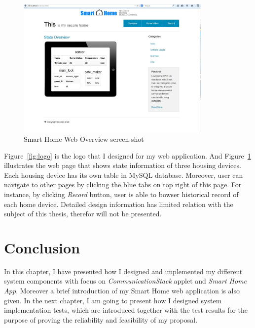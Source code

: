 \begin{figure}[!htb]
	\centering
	\includegraphics[width=0.85\textwidth]{Images/design/overview.jpg}
		\caption{Smart Home Web Overview screen-shot}
	\label{fig:smart-home-frontpage}
\end{figure}

Figure~\ref{fig:logo} is the logo that I designed for my web application. And Figure~\ref{fig:smart-home-frontpage} illustrates the web page that shows state information of three housing devices. Each housing device has its own table in MySQL database. Moreover, user can navigate to other pages by clicking the blue tabs on top right of this page. For instance, by clicking \emph{Record} button, user is able to bowser historical record of each home device. 
Detailed design information has limited relation with the subject of this thesis, therefor will not be presented.

\section{Conclusion}

In this chapter, I have presented how I designed and implemented my different system components with  focus on \emph{CommunicationStack} applet and \emph{Smart Home App}. Moreover a brief introduction of my Smart Home web application is also given. In the next chapter, I am going to present how I designed system implementation tests, which are introduced together with  the test results for the purpose of proving the reliability and feasibility of my proposal.
